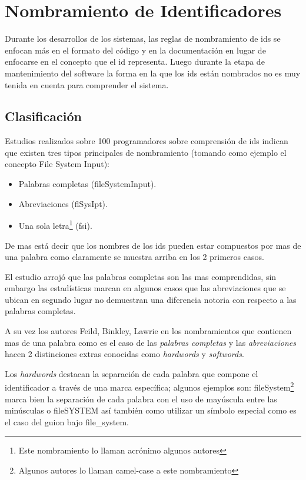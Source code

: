 \documentclass[a4paper,12pt]{report}
\begin{document}
\section{Nombramiento de Identificadores}

Durante los desarrollos de los sistemas, las reglas de nombramiento de ids se enfocan más en el formato del código y en la documentación en lugar de enfocarse en el concepto que el id representa. Luego durante la etapa de mantenimiento del software la forma en la que los ids están nombrados no es muy tenida en cuenta para comprender el sistema.

\subsection{Clasificación}
Estudios realizados sobre 100 programadores\cite{DCHD06} sobre comprensión de ids indican que existen tres tipos principales de nombramiento (tomando como ejemplo el concepto \textsf{File System Input}): 

\begin{itemize}
\itemsep0em%
\item Palabras completas (\textsf{fileSystemInput}).
\item Abreviaciones (\textsf{flSysIpt}).
\item Una sola letra\footnote[1]{Este nombramiento lo llaman acrónimo algunos autores} (\textsf{fsi}). 
\end{itemize}

De mas está decir que los nombres de los ids pueden estar compuestos por mas de una palabra como claramente se muestra arriba en los 2 primeros casos.

El estudio arrojó que las palabras completas son las mas comprendidas, sin embargo las estadísticas marcan en algunos casos que las abreviaciones que se ubican en segundo lugar no demuestran una diferencia notoria con respecto a las palabras completas\cite{DCHD06}.

A su vez los autores  Feild, Binkley, Lawrie \cite{FBL06,HDD06,DMDJ13} en los nombramientos que contienen mas de una palabra como es el caso de las \textit{palabras completas} y las \textit{abreviaciones} hacen 2 distinciones extras conocidas como \textit{hardwords} y \textit{softwords}.

Los \textit{hardwords} destacan la separación de cada palabra que compone el identificador a través de una marca específica; algunos ejemplos son: \textsf{fileSystem}\footnote[1]{Algunos autores lo llaman camel-case a este nombramiento} marca bien la separación de cada palabra con el uso de mayúscula entre las minúsculas o \textsf{fileSYSTEM} así también como utilizar un símbolo especial como es el caso del guion bajo \textsf{file\_system}. 
\end{document}
